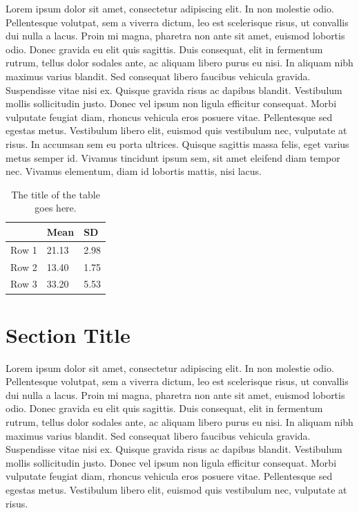 Lorem ipsum dolor sit amet, consectetur adipiscing elit. In non molestie odio. Pellentesque volutpat, sem a viverra dictum, leo est scelerisque risus, ut convallis dui nulla a lacus. Proin mi magna, pharetra non ante sit amet, euismod lobortis odio. Donec gravida eu elit quis sagittis. Duis consequat, elit in fermentum rutrum, tellus dolor sodales ante, ac aliquam libero purus eu nisi. In aliquam nibh maximus varius blandit. Sed consequat libero faucibus vehicula gravida. Suspendisse vitae nisi ex. Quisque gravida risus ac dapibus blandit. Vestibulum mollis sollicitudin justo. Donec vel ipsum non ligula efficitur consequat. Morbi vulputate feugiat diam, rhoncus vehicula eros posuere vitae. Pellentesque sed egestas metus. Vestibulum libero elit, euismod quis vestibulum nec, vulputate at risus. In accumsan sem eu porta ultrices. Quisque sagittis massa felis, eget varius metus semper id. Vivamus tincidunt ipsum sem, sit amet eleifend diam tempor nec. Vivamus elementum, diam id lobortis mattis, nisi lacus.

\begin{table}[tbh]
\caption[The title of the table goes here.]{The title of the table goes here.}
\label{tab:table_example1_4}
\begin{center}
\begin{tabular}{lll}
      & Mean  & SD   \\ \hline
Row 1 & 21.13 & 2.98 \\ 
Row 2 & 13.40 & 1.75 \\ 
Row 3 & 33.20 & 5.53 \\ \hline
\end{tabular}
\end{center}
\end{table}


\section{Section Title}
Lorem ipsum dolor sit amet, consectetur adipiscing elit. In non molestie odio. Pellentesque volutpat, sem a viverra dictum, leo est scelerisque risus, ut convallis dui nulla a lacus. Proin mi magna, pharetra non ante sit amet, euismod lobortis odio. Donec gravida eu elit quis sagittis. Duis consequat, elit in fermentum rutrum, tellus dolor sodales ante, ac aliquam libero purus eu nisi. In aliquam nibh maximus varius blandit. Sed consequat libero faucibus vehicula gravida. Suspendisse vitae nisi ex. Quisque gravida risus ac dapibus blandit. Vestibulum mollis sollicitudin justo. Donec vel ipsum non ligula efficitur consequat. Morbi vulputate feugiat diam, rhoncus vehicula eros posuere vitae. Pellentesque sed egestas metus. Vestibulum libero elit, euismod quis vestibulum nec, vulputate at risus. 


